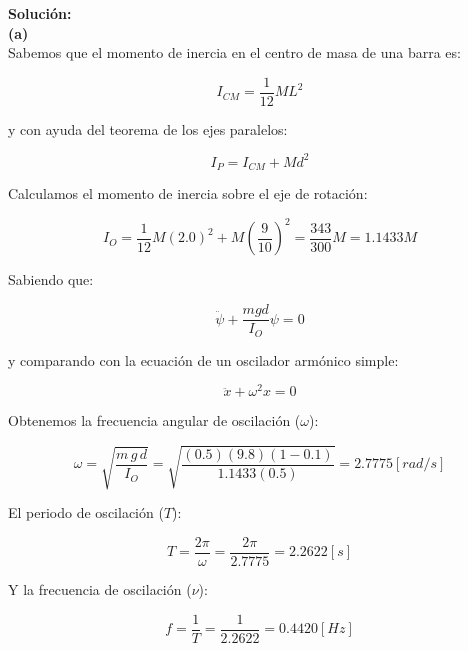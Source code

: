 \documentclass[letter,11pt]{article}
\begin{document}
\vspace{0.5cm}
\textbf{Solución:} \\

\textbf{(a)} \\

Sabemos que el momento de inercia en el centro de masa de una barra es:

\begin{equation*}
    I_{CM} = \frac{1}{12} M L^2
\end{equation*}

y con ayuda del teorema de los ejes paralelos:

\begin{equation*}
    I_{P} = I_{CM} + M d^2
\end{equation*}

Calculamos el momento de inercia sobre el eje de rotación:

\begin{equation}
    I_{O} = \frac{1}{12} M (2.0)^2 + M \left(\frac{9}{10}\right)^2 = \frac{343}{300} M = 1.1433 M
\end{equation}

Sabiendo que:

\begin{equation*}
    \ddot{\psi} + \frac{m g d}{I_O} \psi = 0
\end{equation*}

y comparando con la ecuación de un oscilador armónico simple:

\begin{equation*}
    \ddot{x} + \omega^2 x = 0
\end{equation*}

Obtenemos la frecuencia angular de oscilación ($\omega$):

\begin{equation}
    \omega = \sqrt{ \frac{m\, g\, d}{I_O} } = \sqrt{ \frac{(0.5)(9.8)(1-0.1)}{1.1433 (0.5)} } = 2.7775 [rad/s]
\end{equation}

El periodo de oscilación ($T$):

\begin{equation}
    T = \frac{2 \pi}{\omega} = \frac{2 \pi}{2.7775} = 2.2622 [s]
\end{equation}

Y la frecuencia de oscilación ($\nu$):

\begin{equation}
    f = \frac{1}{T} = \frac{1}{2.2622} = 0.4420 [Hz]
\end{equation}
\end{document}
